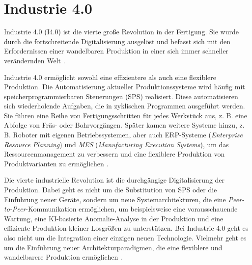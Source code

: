 \section{Industrie 4.0}

Industrie 4.0 (I4.0) ist die vierte große Revolution in der Fertigung. Sie wurde durch die fortschreitende Digitalisierung ausgelöst und befasst sich mit den Erfordernissen einer wandelbaren Produktion in einer sich immer schneller verändernden Welt \cite{kuhnServicebasedArchitecturesProduction2020}.

Industrie 4.0 ermöglicht sowohl eine effizientere als auch eine flexiblere Produktion. Die Automatisierung aktueller Produktionssysteme wird häufig mit speicherprogrammierbaren Steuerungen (SPS) realisiert. Diese automatisieren sich wiederholende Aufgaben, die in zyklischen Programmen ausgeführt werden. Sie führen eine Reihe von Fertigungsschritten für jedes Werkstück aus, z. B. eine Abfolge von Fräs- oder Bohrvorgängen. Später kamen weitere Systeme hinzu, z. B. Roboter mit eigenen Betriebssystemen, aber auch ERP-Systeme (\textit{Enterprise Resource Planning}) und \textit{MES} (\textit{Manufacturing Execution Systems}), um das Ressourcenmanagement zu verbessern und eine flexiblere Produktion von Produktvarianten zu ermöglichen \cite{kuhnServicebasedArchitecturesProduction2020}.


Die vierte industrielle Revolution ist die durchgängige Digitalisierung der Produktion. Dabei geht es nicht um die Substitution von SPS oder die Einführung neuer Geräte, sondern um neue Systemarchitekturen, die eine \textit{Peer-to-Peer}-Kommunikation ermöglichen, um beispielsweise eine vorausschauende Wartung, eine KI-basierte Anomalie-Analyse in der Produktion und eine effiziente Produktion kleiner Losgrößen zu unterstützen. Bei Industrie 4.0 geht es also nicht um die Integration einer einzigen neuen Technologie. Vielmehr geht es um die Einführung neuer Architekturparadigmen, die eine flexiblere und wandelbarere Produktion ermöglichen \cite{kuhnServicebasedArchitecturesProduction2020}.



